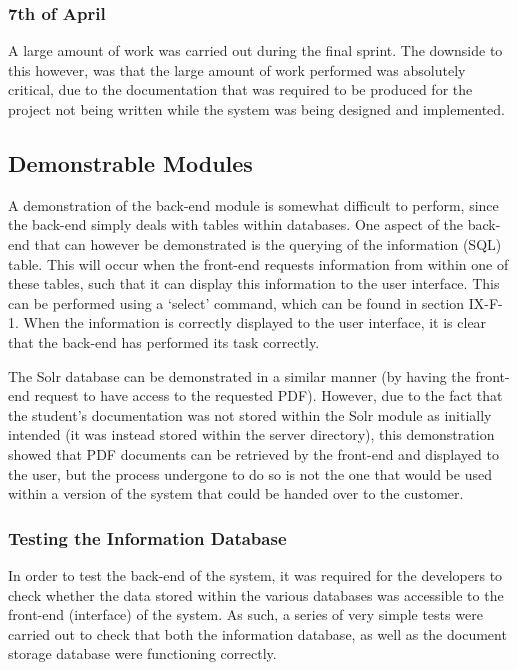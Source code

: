 \documentclass[journal]{IEEEtran}
\begin{document}
\subsubsection{7th of April}

A large amount of work was carried out during the final sprint. The downside to this however, was that the large amount of work performed was absolutely critical, due to the documentation that was required to be produced for the project not being written while the system was being designed and implemented.


\subsection{Demonstrable Modules}

A demonstration of the back-end module is somewhat difficult to perform, since the back-end simply deals with tables within databases. One aspect of the back-end that can however be demonstrated is the querying of the information (SQL) table. This will occur when the front-end requests information from within one of these tables, such that it can display this information to the user interface. This can be performed using a `select' command, which can be found in section IX-F-1. When the information is correctly displayed to the user interface, it is clear that the back-end has performed its task correctly.

\hfill \break The Solr database can be demonstrated in a similar manner (by having the front-end request to have access to the requested PDF). However, due to the fact that the student's documentation was not stored within the Solr module as initially intended (it was instead stored within the server directory), this demonstration showed that PDF documents can be retrieved by the front-end and displayed to the user, but the process undergone to do so is not the one that would be used within a version of the system that could be handed over to the customer. \\

\subsubsection{Testing the Information Database}

In order to test the back-end of the system, it was required for the developers to check whether the data stored within the various databases was accessible to the front-end (interface) of the system. As such, a series of very simple tests were carried out to check that both the information database, as well as the document storage database were functioning correctly.
\end{document}
